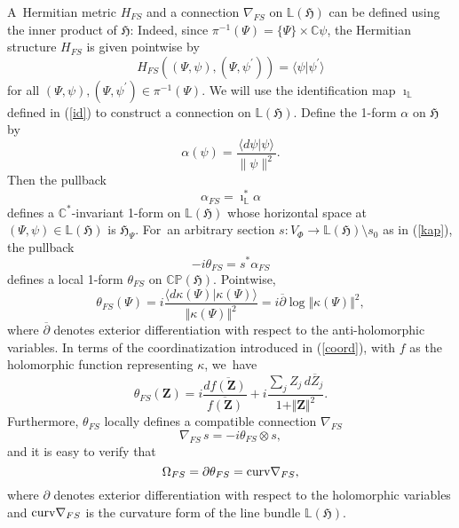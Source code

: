 \documentclass[11pt]{amsart}
\numberwithin{equation}{section}
\theoremstyle{remark}
\newcommand\HH{\mathfrak H}
\newcommand{\prhs}{{\mathbb C\mathbb P}( \HH)}
\newcommand{\C}{\mathbb C}
\begin{document}
A~Hermitian metric $H_{FS}$ and a connection $\nabla_{FS}$ on $\mathbb L(\HH)$
can be defined using the inner product of $\HH$: Indeed, since $\pi^{-1}(\Psi)
= \{\Psi\} \times {\C} \psi$, the Hermitian structure $H_{FS}$ is  given
pointwise by
\begin{equation}
H_{FS}((\Psi, \psi),(\Psi, \psi^\prime)) = \langle \psi \vert \psi^\prime
\rangle \end{equation}
for all $(\Psi, \psi),(\Psi, \psi^\prime) \in \pi^{-1}(\Psi)$.  We will use
the identification map $\imath_\mathbb L$ defined in (\ref{id}) to construct a
connection on $\mathbb L(\HH)$. Define the 1-form $\alpha $ on $\HH$ by
\begin{equation}
\alpha(\psi)= \frac{\langle d\psi \vert \psi \rangle}{\|\psi\|^2} .
 \end{equation}
Then the pullback
\begin{equation}
\alpha_{FS} = \imath^*_\mathbb L \alpha
\end{equation}
defines a ${\C}^*$-invariant 1-form on $\mathbb L(\HH)$ whose horizontal space
at $(\Psi, \psi) \in \mathbb L(\HH)$ is $\HH_\Psi$. For~an arbitrary section
$s: V_\Phi \to \mathbb L(\HH) \setminus s_0$ as in (\ref{kap}), the pullback
\begin{equation}\label{pot}
-i\theta_{FS} = s^*\alpha_{FS}
\end{equation}
defines a local 1-form $\theta_{FS}$ on $\prhs$. Pointwise,
\begin{equation}
\theta_{FS}(\Psi) = i\frac{\langle d\kappa(\Psi)\vert
\kappa(\Psi)\rangle}{\Vert \kappa(\Psi) \Vert^2} = i\overline{\partial} \log
\Vert \kappa(\Psi)\Vert^2 ,
\end{equation}
where $\overline{\partial}$ denotes exterior differentiation with respect to
the anti-holomorphic variables. In terms of the coordinatization introduced in
(\ref{coord}), with $f$ as the holomorphic function representing $\kappa$,
we~have
\begin{equation}
\theta_{FS}({\mathbf Z}) = i\frac{d\overline{f({\mathbf Z})}}
  {\overline{f({\mathbf Z})}} + i\frac{\sum_j Z_j\,d\overline{Z}_{j}}
  {1 + \Vert {\mathbf Z}\Vert^2}.
\end{equation}
Furthermore, $\theta_{FS}$ locally defines a compatible connection
$\nabla_{FS}$
\begin{equation}
\nabla_{FS}\,s = -i\theta_{FS} \otimes s,
\end{equation}
and it is easy to verify that
\begin{equation}
\Omega_{FS} = \partial \theta_{FS} =  \mbox{\rm curv}\nabla_{FS},
\end{equation}
where $\partial$ denotes exterior differentiation with respect to the
holomorphic variables and $\mbox{\rm curv}\nabla_{FS}$ is the curvature form
of the line bundle $\mathbb L(\HH)$.
\end{document}
